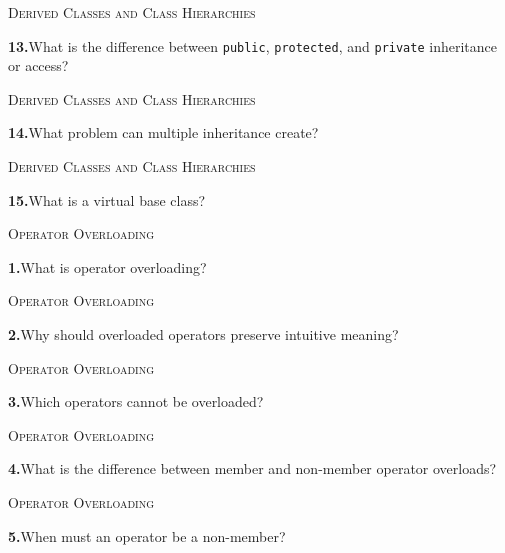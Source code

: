 \documentclass[11pt,a4paper]{article}
\newenvironment{questionblock}{%
  \begin{minipage}[t][0.455\textheight][t]{\textwidth}%
  \raggedright\small
}{%
  \vfill
  \end{minipage}%
}
\newcommand{\sectionlabel}[1]{\textsc{#1}\par\vspace{0.35em}}
\newcommand{\questionnumber}[1]{\textbf{#1.}\enspace}
\begin{document}
\vspace*{0.04\textheight}
\begin{questionblock}
\sectionlabel{Derived Classes and Class Hierarchies}
\questionnumber{13}What is the difference between \verb|public|, \verb|protected|, and \verb|private| inheritance or access?\par
\end{questionblock}
\newpage
\begin{questionblock}
\sectionlabel{Derived Classes and Class Hierarchies}
\questionnumber{14}What problem can multiple inheritance create?\par
\end{questionblock}
\vspace*{0.04\textheight}
\begin{questionblock}
\sectionlabel{Derived Classes and Class Hierarchies}
\questionnumber{15}What is a virtual base class?\par

\end{questionblock}
\newpage
\begin{questionblock}
\sectionlabel{Operator Overloading}
\questionnumber{1}What is operator overloading?\par
\end{questionblock}
\vspace*{0.04\textheight}
\begin{questionblock}
\sectionlabel{Operator Overloading}
\questionnumber{2}Why should overloaded operators preserve intuitive meaning?\par
\end{questionblock}
\newpage
\begin{questionblock}
\sectionlabel{Operator Overloading}
\questionnumber{3}Which operators cannot be overloaded?\par
\end{questionblock}
\vspace*{0.04\textheight}
\begin{questionblock}
\sectionlabel{Operator Overloading}
\questionnumber{4}What is the difference between member and non-member operator overloads?\par
\end{questionblock}
\newpage
\begin{questionblock}
\sectionlabel{Operator Overloading}
\questionnumber{5}When must an operator be a non-member?\par
\end{questionblock}
\vspace*{0.04\textheight}
\end{document}
